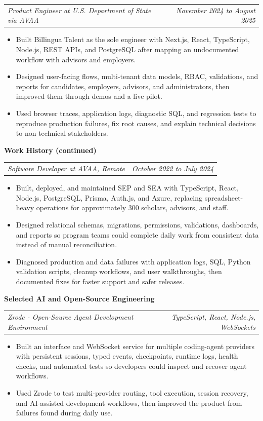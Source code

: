 \documentclass[10pt,letterpaper]{article}
\makeatletter
\newcommand{\bodyfont}{\fontsize{10.5}{15.75}\selectfont}
\newcommand{\sectiontitle}[1]{%
  \par\vspace{4pt}
  {\bodyfont\textbf{#1}}\par
  \nopagebreak[4]
  \vspace{2pt}
}
\newcommand{\roleline}[2]{%
  \begin{tabularx}{\textwidth}{@{}Xr@{}}
    \bodyfont\textit{#1} & \bodyfont\textit{#2}
  \end{tabularx}
  \nopagebreak[4]
  \vspace{1pt}
}
\makeatother
\begin{document}
\vspace{3pt}
\roleline{Product Engineer at U.S. Department of State via AVAA}{November 2024 to August 2025}
\begin{itemize}
  \item Built Billingua Talent as the sole engineer with Next.js, React, TypeScript, Node.js, REST APIs, and PostgreSQL after mapping an undocumented workflow with advisors and employers.
  \item Designed user-facing flows, multi-tenant data models, RBAC, validations, and reports for candidates, employers, advisors, and administrators, then improved them through demos and a live pilot.
  \item Used browser traces, application logs, diagnostic SQL, and regression tests to reproduce production failures, fix root causes, and explain technical decisions to non-technical stakeholders.
\end{itemize}

\newpage
\sectiontitle{Work History (continued)}

\roleline{Software Developer at AVAA, Remote}{October 2022 to July 2024}
\begin{itemize}
  \item Built, deployed, and maintained SEP and SEA with TypeScript, React, Node.js, PostgreSQL, Prisma, Auth.js, and Azure, replacing spreadsheet-heavy operations for approximately 300 scholars, advisors, and staff.
  \item Designed relational schemas, migrations, permissions, validations, dashboards, and reports so program teams could complete daily work from consistent data instead of manual reconciliation.
  \item Diagnosed production and data failures with application logs, SQL, Python validation scripts, cleanup workflows, and user walkthroughs, then documented fixes for faster support and safer releases.
\end{itemize}

\sectiontitle{Selected AI and Open-Source Engineering}

\vspace{3pt}
\roleline{Zrode - Open-Source Agent Development Environment}{TypeScript, React, Node.js, WebSockets}
\begin{itemize}
  \item Built an interface and WebSocket service for multiple coding-agent providers with persistent sessions, typed events, checkpoints, runtime logs, health checks, and automated tests so developers could inspect and recover agent workflows.
  \item Used Zrode to test multi-provider routing, tool execution, session recovery, and AI-assisted development workflows, then improved the product from failures found during daily use.
\end{itemize}
\end{document}
